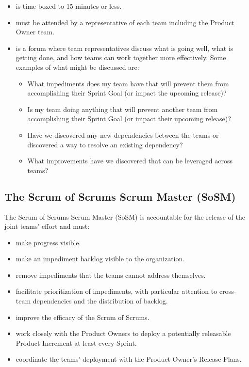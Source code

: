 \documentclass[12pt,a4paper,parskip=full]{scrartcl}
\begin{document}
\begin{itemize}
\item is time-boxed to 15 minutes or less.
\item must be attended by a representative of each team including the Product Owner team.
\item is a forum where team representatives discuss what is going well, what is getting done, and how teams can work together more effectively. Some examples of what might be discussed are:
\begin{itemize}
\item What impediments does my team have that will prevent them from
accomplishing their Sprint Goal (or impact the upcoming release)?
\item Is my team doing anything that will prevent another team from
accomplishing their Sprint Goal (or impact their upcoming release)?
\item Have we discovered any new dependencies between the teams or
discovered a way to resolve an existing dependency?
\item What improvements have we discovered that can be leveraged across teams?
\end{itemize}
\end{itemize}

\subsection{The Scrum of Scrums Scrum Master (SoSM)}
The Scrum of Scrums Scrum Master (SoSM) is accountable for the release of the
joint teams' effort and must:
\begin{itemize}
\item make progress visible.
\item make an impediment backlog visible to the organization.
\item remove impediments that the teams cannot address themselves.
\item facilitate prioritization of impediments, with particular attention to cross-team
dependencies and the distribution of backlog.
\item improve the efficacy of the Scrum of Scrums.
\item work closely with the Product Owners to deploy a potentially
releasable Product Increment at least every Sprint.
\item coordinate the teams' deployment with the Product Owner's Release
Plans.
\end{itemize}
\end{document}
